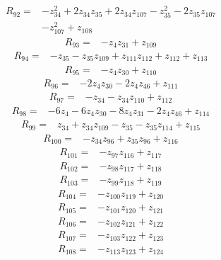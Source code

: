 \begin{align*}
R_{92}={}&-z_{34}^{2}+2z_{34}z_{35}+2z_{34}z_{107}-z_{35}^{2}-2z_{35}z_{107}\\
&-z_{107}^{2}+z_{108}
\end{align*}
\begin{align*}
R_{93}={}&-z_{4}z_{31}+z_{109}
\end{align*}
\begin{align*}
R_{94}={}&-z_{35}-z_{35}z_{109}+z_{111}z_{112}+z_{112}+z_{113}
\end{align*}
\begin{align*}
R_{95}={}&-z_{4}z_{30}+z_{110}
\end{align*}
\begin{align*}
R_{96}={}&-2z_{4}z_{30}-2z_{4}z_{46}+z_{111}
\end{align*}
\begin{align*}
R_{97}={}&-z_{34}-z_{34}z_{110}+z_{112}
\end{align*}
\begin{align*}
R_{98}={}&-6z_{4}-6z_{4}z_{30}-8z_{4}z_{31}-2z_{4}z_{46}+z_{114}
\end{align*}
\begin{align*}
R_{99}={}&z_{34}+z_{34}z_{109}-z_{35}-z_{35}z_{114}+z_{115}
\end{align*}
\begin{align*}
R_{100}={}&-z_{34}z_{96}+z_{35}z_{96}+z_{116}
\end{align*}
\begin{align*}
R_{101}={}&-z_{97}z_{116}+z_{117}
\end{align*}
\begin{align*}
R_{102}={}&-z_{98}z_{117}+z_{118}
\end{align*}
\begin{align*}
R_{103}={}&-z_{99}z_{118}+z_{119}
\end{align*}
\begin{align*}
R_{104}={}&-z_{100}z_{119}+z_{120}
\end{align*}
\begin{align*}
R_{105}={}&-z_{101}z_{120}+z_{121}
\end{align*}
\begin{align*}
R_{106}={}&-z_{102}z_{121}+z_{122}
\end{align*}
\begin{align*}
R_{107}={}&-z_{103}z_{122}+z_{123}
\end{align*}
\begin{align*}
R_{108}={}&-z_{113}z_{123}+z_{124}
\end{align*}

